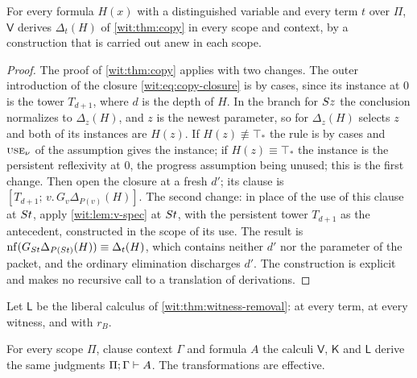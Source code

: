 \begin{lemma}
\label{wit:lem:v-copy}
For every formula $H(x)$ with a distinguished variable and every term $t$
over $\Pi$, $\mathsf V$ derives $\Delta_t(H)$ of \cref{wit:thm:copy} in every
scope and context, by a construction that is carried out anew in each
scope.
\end{lemma}

\begin{proof}
The proof of \cref{wit:thm:copy} applies with two changes.  The outer
introduction of the closure \eqref{wit:eq:copy-closure} is by cases, since
its instance at $0$ is the tower $T_{d+1}$, where $d$ is the depth of $H$.
In the branch for $S z$ the conclusion normalizes to $\Delta_z(H)$, and
$z$ is the newest parameter, so  for $\Delta_z(H)$ selects
$z$ and both of its instances are $H(z)$.  If $H(z)\not\equiv\top_{*}$ the
rule is by cases and $\rulename{Use}_\nu$ of the assumption gives the
instance; if $H(z)\equiv\top_{*}$ the instance is the persistent reflexivity
at $0$, the progress assumption being unused; this is the first change.
Then open the closure at a fresh $d'$; its clause is
$[T_{d+1};\,v.\,G_v\Delta_{P(v)}(H)]$.  The second change: in place of the
use of this clause at $S t$, apply \cref{wit:lem:v-spec} at $S t$,
with the persistent tower $T_{d+1}$ as the antecedent, constructed in the
scope of its use.  The result is
$\operatorname{nf}(G_{S t}\Delta_{P(S t)}(H))\equiv\Delta_t(H)$, which contains
neither $d'$ nor the parameter of the packet, and the ordinary elimination
discharges $d'$.  The construction is explicit and makes no recursive call
to a translation of derivations.
\end{proof}

Let $\mathsf L$ be the liberal calculus of \cref{wit:thm:witness-removal}:
 at every term,  at every witness, and
 with $r_B$.

\begin{theorem}
\label{wit:thm:v-equiv}
For every scope $\Pi$, clause context $\Gamma$ and formula $A$ the calculi
$\mathsf V$, $\mathsf K$ and $\mathsf L$ derive the same judgments
$\Pi;\Gamma\vdash A$.  The transformations are effective.
\end{theorem}

